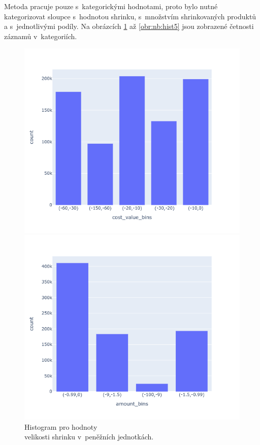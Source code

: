 Metoda pracuje pouze s~kategorickými hodnotami, proto bylo nutné kategorizovat sloupce s~hodnotou shrinku, s~množstvím shrinkovaných produktů a s~jednotlivými podíly. Na obrázcích \ref*{obr:nb:hist} až \ref{obr:nb:hist5} jsou zobrazené četnosti záznamů v~kategoriích.

\begin{figure}[h!]
    \centering
    \begin{minipage}[b]{.55\textwidth}
      \centering
      \captionsetup{justification=centering}

      \includegraphics[width=\textwidth]{obrazky/grafy/histogram/newplot(2).png}
      \vspace*{-3em}
      \caption{Histogram pro hodnoty \\ velikosti shrinku v~peněžních jednotkách.}
      \label{obr:nb:hist}
    \end{minipage}%
    \hspace*{-2em}
    \begin{minipage}[b]{.55\textwidth}
        \centering
        \captionsetup{justification=centering}
        \includegraphics[width=\textwidth]{obrazky/grafy/histogram/newplot(1).png}

\end{minipage}
\end{figure}
